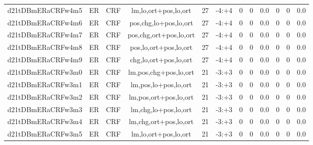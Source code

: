 \documentclass[a4paper]{article}
\begin{document}
\begin{landscape}
\begin{center}
\begin{tabular}{ |c|c|c|c|c|c|c|c|c|c|c|c|}
 
 	
 	\small{ d21tDBmERaCRFw4m5 } & ER & CRF & lm,lo,ort+pos,lo,ort  &  27 &  -4:+4  &  0 & 0 & 0.0  &  0 & 0 & 0.0 \\
 	

 
 	
 	\small{ d21tDBmERaCRFw4m6 } & ER & CRF & pos,chg,lo+pos,lo,ort  &  27 &  -4:+4  &  0 & 0 & 0.0  &  0 & 0 & 0.0 \\
 	

 
 	
 	\small{ d21tDBmERaCRFw4m7 } & ER & CRF & pos,chg,ort+pos,lo,ort  &  27 &  -4:+4  &  0 & 0 & 0.0  &  0 & 0 & 0.0 \\
 	

 
 	
 	\small{ d21tDBmERaCRFw4m8 } & ER & CRF & pos,lo,ort+pos,lo,ort  &  27 &  -4:+4  &  0 & 0 & 0.0  &  0 & 0 & 0.0 \\
 	

 
 	
 	\small{ d21tDBmERaCRFw4m9 } & ER & CRF & chg,lo,ort+pos,lo,ort  &  27 &  -4:+4  &  0 & 0 & 0.0  &  0 & 0 & 0.0 \\
 	

 
 	
 	\small{ d21tDBmERaCRFw3m0 } & ER & CRF & lm,pos,chg+pos,lo,ort  &  21 &  -3:+3  &  0 & 0 & 0.0  &  0 & 0 & 0.0 \\
 	

 
 	
 	\small{ d21tDBmERaCRFw3m1 } & ER & CRF & lm,pos,lo+pos,lo,ort  &  21 &  -3:+3  &  0 & 0 & 0.0  &  0 & 0 & 0.0 \\
 	

 
 	
 	\small{ d21tDBmERaCRFw3m2 } & ER & CRF & lm,pos,ort+pos,lo,ort  &  21 &  -3:+3  &  0 & 0 & 0.0  &  0 & 0 & 0.0 \\
 	

 
 	
 	\small{ d21tDBmERaCRFw3m3 } & ER & CRF & lm,chg,lo+pos,lo,ort  &  21 &  -3:+3  &  0 & 0 & 0.0  &  0 & 0 & 0.0 \\
 	

 
 	
 	\small{ d21tDBmERaCRFw3m4 } & ER & CRF & lm,chg,ort+pos,lo,ort  &  21 &  -3:+3  &  0 & 0 & 0.0  &  0 & 0 & 0.0 \\
 	

 
 	
 	\small{ d21tDBmERaCRFw3m5 } & ER & CRF & lm,lo,ort+pos,lo,ort  &  21 &  -3:+3  &  0 & 0 & 0.0  &  0 & 0 & 0.0 \\
 	


\end{tabular}
\end{center}
\end{landscape}
\end{document}
